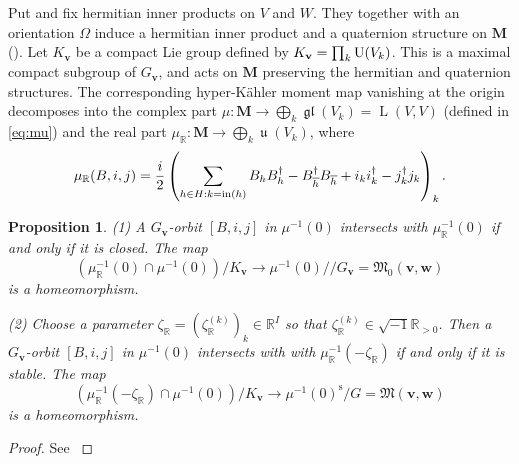 \documentclass[12pt]{amsart}
\def\Bbb{\mathbb}
\def\frak{\mathfrak}
\newcommand{\rom}{\textup}
\newtheorem{Proposition}[equation]{Proposition}
\theoremstyle{definition}
\theoremstyle{remark}
\numberwithin{equation}{subsection}
\newcommand{\R}{{\Bbb R}}
\newcommand{\U}{\operatorname{\rm U}}
\newcommand{\gl}{\operatorname{\frak{gl}}}
\newcommand{\algu}{\operatorname{\frak{u}}}
\newcommand{\vin}{\operatorname{in}} %
\newcommand{\bM}{{\mathbf M}} %
\newcommand{\M}{{\frak M}} %
\newcommand{\dslash}{/\!\!/} %
\newcommand{\bv}{{\mathbf v}} %
\newcommand{\bw}{{\mathbf w}} %
\newcommand{\HomL}{\operatorname{L}}
\begin{document}
Put and fix hermitian inner products on $V$ and $W$. They together
with an orientation $\Omega$ induce a hermitian inner product and a
quaternion structure on $\bM$ (\cite[p.370]{Na-quiver}). Let $K_\bv$
be a compact Lie group defined by $K_\bv = \prod_k \U(V_k)$.
%
This is a maximal compact subgroup of $G_\bv$, and acts on $\bM$
preserving the hermitian and quaternion structures. The corresponding
hyper-K\"ahler moment map vanishing at the origin decomposes into
the complex part 
$\mu\colon \bM\to \bigoplus_k \gl(V_k) = \HomL(V,V)$
(defined in \eqref{eq:mu})
and
the real part
$\mu_\R\colon \bM \to \bigoplus_k \algu(V_k)$,
where
\begin{equation*}
 \mu_\R(B,i,j) = {i\over 2}\left(
        \sum_{h\in H: k = \vin(h)} B_h B_h^\dagger
         - B_{\overline h}^\dagger B_{\overline h}
         + i_k i_k^\dagger - j_k^\dagger j_k\right)_k .
\end{equation*}
\begin{Proposition}\label{prop:hK}
\rom{(1)} A $G_\bv$-orbit $[B,i,j]$ in $\mu^{-1}(0)$ intersects with
$\mu_\R^{-1}(0)$ if and only if it is closed. The map
\begin{equation*}
   \left(\mu_\R^{-1}(0)\cap \mu^{-1}(0)\right) / K_\bv
   \to \mu^{-1}(0)\dslash G_\bv = \M_0(\bv,\bw)
\end{equation*}
is a homeomorphism.

\rom{(2)} Choose a parameter $\zeta_\R = (\zeta_\R^{(k)})_k \in
\R^I$ so that $\zeta_\R^{(k)}\in \sqrt{-1}\R_{> 0}$. Then
a $G_\bv$-orbit $[B,i,j]$ in $\mu^{-1}(0)$ intersects with
with $\mu_\R^{-1}(-\zeta_\R)$ if and only if it is stable. The map
\begin{equation*}
   \left(\mu_\R^{-1}(-\zeta_\R)\cap \mu^{-1}(0)\right) / K_\bv
   \to \mu^{-1}(0)^{\operatorname{s}}/G = \M(\bv,\bw)
\end{equation*}
is a homeomorphism.
\end{Proposition}

\begin{proof}
See \cite[3.1,3.2,3.5]{Na-quiver}
\end{proof}

\subsection{}\label{subsec:M_0}
\end{document}
